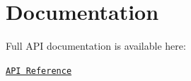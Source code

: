\chapter{Documentation }
\hypertarget{md__r_e_a_d_m_e}{}\label{md__r_e_a_d_m_e}
\label{md__r_e_a_d_m_e_autotoc_md19}%
%


Full API documentation is available here:\+


\begin{DoxyItemize}
\item \href{Documentation~/Doxygen/html/index.html}{\texttt{API Reference}} 
\end{DoxyItemize}